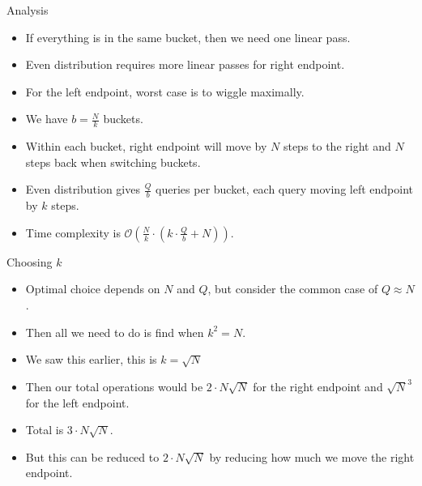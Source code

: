 \documentclass{beamer}
\begin{document}
\begin{frame}[plain]{Analysis}
    \begin{itemize}
        \item<1-> If everything is in the same bucket, then we need one linear pass.
        \item<1-> Even distribution requires more linear passes for right endpoint.
        \item<2-> For the left endpoint, worst case is to wiggle maximally.
        \item<2-> We have $b = \frac{N}{k}$ buckets.
        \item<3-> Within each bucket, right endpoint will move by $N$ steps to the right and $N$ steps back when switching buckets.
        \item<4-> Even distribution gives $\frac{Q}{b}$ queries per bucket, each query moving left endpoint by $k$ steps.
        \item<5-> Time complexity is $\mathcal{O}\left(\frac{N}{k} \cdot (k \cdot \frac{Q}{b} + N)\right)$.
    \end{itemize}
\end{frame}

\begin{frame}[plain]{Choosing $k$}
    \begin{itemize}
        \item<1-> Optimal choice depends on $N$ and $Q$, but consider the common case of $Q \approx N$.
        \item<1-> Then all we need to do is find when $k^2 = N$.
        \item<1-> We saw this earlier, this is $k = \sqrt{N}$
        \item<2-> Then our total operations would be $2 \cdot N\sqrt{N}$ for the right endpoint and $\sqrt{N}^3$ for the left endpoint.
        \item<2-> Total is $3 \cdot N \sqrt{N}$.
        \item<2-> But this can be reduced to $2 \cdot N \sqrt{N}$ by reducing how much we move the right endpoint.
    \end{itemize}
\end{frame}
\end{document}
